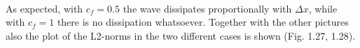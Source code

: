 \documentclass[11pt,a4paper]{article}
\begin{document}
\begin{figure}[!h]
\end{figure}\\
As expected, with $c_f=0.5$ the wave dissipates proportionally with $\Delta x$, while with $c_f= 1$ there is no dissipation whatsoever. Together with the other pictures also the plot of the L2-norms in the two different cases is shown (Fig. 1.27, 1.28). \\
\end{document}
